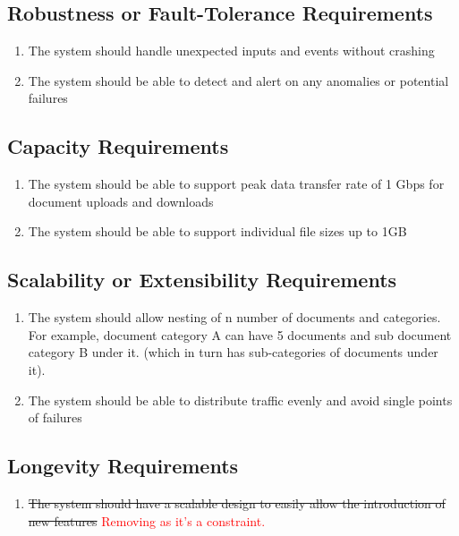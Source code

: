 \documentclass[12pt]{article}
\begin{document}
\subsection{Robustness or Fault-Tolerance Requirements}
\begin{enumerate}[{PR-RFT}1.]
  \item The system should handle unexpected inputs and events without crashing
  \item The system should be able to detect and alert on any
    anomalies or potential failures
\end{enumerate}

\subsection{Capacity Requirements}
\begin{enumerate}[{PR-CR}1.]
  \item The system should be able to support peak data transfer rate
    of 1 Gbps for document uploads and downloads
  \item The system should be able to support individual file sizes up to 1GB
\end{enumerate}

\subsection{Scalability or Extensibility Requirements}
\begin{enumerate}[{PR-SE}1.]
  \item The system should allow nesting of n number of documents and
    categories. For example, document category A can have 5 documents
    and sub document category B under it. (which in turn has
    sub-categories of documents under it).
  \item The system should be able to distribute traffic evenly and
    avoid single points of failures
\end{enumerate}

\subsection{Longevity Requirements}
\begin{enumerate}[{PR-LR}1.]
  \item \sout{The system should have a scalable design to easily allow the
    introduction of new features} \textcolor{red}{Removing as it's a constraint.}
\end{enumerate}
\end{document}

